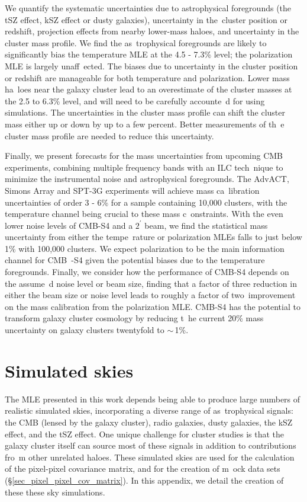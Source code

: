 We quantify the systematic uncertainties due to astrophysical foregrounds (the tSZ effect, kSZ effect or dusty galaxies), uncertainty in the\
 cluster position or redshift, projection effects from nearby lower-mass haloes, and uncertainty in the cluster mass profile. We find the as\
trophysical foregrounds are likely to significantly bias the temperature MLE at the 4.5 - 7.3\% level; the polarization MLE is largely unaff\
ected. The biases due to uncertainty in the cluster position or redshift are manageable for both temperature and polarization. Lower mass ha\
loes near the galaxy cluster lead to an overestimate of the cluster masses at the 2.5 to 6.3\% level, and will need to be carefully accounte\
d for using simulations.
The uncertainties in the cluster mass profile can shift the cluster mass either up or down by up to a few percent. Better measurements of th\
e cluster mass profile are needed to reduce this uncertainty.

Finally, we present forecasts for the mass uncertainties from upcoming CMB experiments,  combining multiple frequency bands with an ILC tech\
nique to minimize the instrumental noise and astrophysical foregrounds. The AdvACT, Simons Array and SPT-3G experiments will achieve mass ca\
libration uncertainties of order 3 - 6\% for a sample containing 10,000 clusters, with the temperature channel being crucial to these mass c\
onstraints. With the even lower noise levels of CMB-S4 and a $2^\prime$ beam, we find the statistical mass uncertainty from either the tempe\
rature or polarization MLEs falls to just below 1\% with 100,000 clusters. We expect polarization to be the main information channel for CMB\
-S4 given the potential biases  due to the temperature foregrounds. Finally, we consider how the performance of CMB-S4 depends on the assume\
d noise level or beam size, finding that a factor of three reduction in either the beam size or noise level leads to roughly a factor of two\
 improvement on the mass calibration from the polarization MLE. CMB-S4 has the potential to transform galaxy cluster cosmology by reducing t\
he current 20\% mass uncertainty on galaxy clusters twentyfold to $\sim$\,1\%.

\appendix
\section{Simulated skies}
\label{sec_appendix}
The MLE presented in this work depends being able to produce large numbers of realistic simulated skies, incorporating a diverse range of as\
trophysical signals: the CMB (lensed by the galaxy cluster), radio galaxies, dusty galaxies, the kSZ effect, and the tSZ effect.
One unique challenge for cluster studies is that the galaxy cluster itself can source most of these signals in addition to contributions fro\
m other unrelated haloes. These simulated skies are used for the calculation of the pixel-pixel covariance matrix, and for the creation of m\
ock data sets (\S\ref{sec_pixel_pixel_cov_matrix}). In this appendix, we detail the creation of these these sky simulations.

